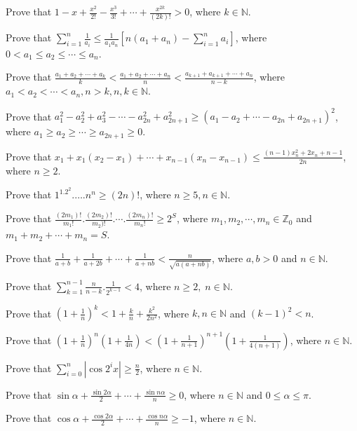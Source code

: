 \item Prove that $1 - x + \frac{x^2}{2!} - \frac{x^3}{3!} + \cdots + \frac{x^{2k}}{(2k)!} > 0$, where $k\in\mathbb{N}$.
\item Prove that $\displaystyle\sum_{i=1}^n\frac{1}{a_i}\leq\frac{1}{a_1a_n}\left[n(a_1 + a_n) - \sum_{i=1}^na_i\right]$, where
  $0<a_1\leq a_2\leq \cdots\leq a_n$.
\item Prove that $\frac{a_1 + a_2 + \cdots + a_k}{k} < \frac{a_1 + a_2 + \cdots + a_n}{n} < \frac{a_{k + 1} + a_{k + 1} + \cdots +
  a_n}{n - k}$, where $a_1 < a_2 < \cdots < a_n, n > k, n, k\in\mathbb{N}$.
\item Prove that $a_1^2 - a_2^2 + a_3^2 - \cdots - a_{2n}^2 + a_{2n + 1}^2\geq (a_1 - a_2 + \cdots - a_{2n} + a_{2n + 1})^2$, where
  $a_1\geq a_2\geq \cdots \geq a_{2n + 1}\geq 0$.
\item Prove that $x_1 + x_1(x_2 - x_1) + \cdots + x_{n - 1}(x_n - x_{n - 1})\leq \frac{(n - 1)x_n^2 + 2x_n + n - 1}{2n}$, where
  $n\geq 2$.
\item Prove that $1^1.2^2.\ldots .n^n\geq (2n)!$, where $n\geq 5, n\in\mathbb{N}$.
\item Prove that $\frac{(2m_1)!}{m_1!}.\frac{(2m_2)!}{m_2)!}.\cdots .\frac{(2m_n)!}{m_n!}\geq 2^S$, where $m_1, m_2, \cdots,
  m_n\in\mathbb{Z}_0$ and $m_1 + m_2 + \cdots + m_n = S$.
\item Prove that $\frac{1}{a + b} + \frac{1}{a + 2b} + \cdots + \frac{1}{a + nb} < \frac{n}{\sqrt{a(a + nb)}}$, where $a, b > 0$
  and $n\in\mathbb{N}$.
\item Prove that $\displaystyle\sum_{k=1}^{n - 1}\frac{n}{n - k}.\frac{1}{2^{k - 1}} < 4$, where $n\geq 2,\;n\in\mathbb{N}$.
\item Prove that $\left(1 + \frac{1}{n}\right)^k < 1 + \frac{k}{n} + \frac{k^2}{2n^2}$, where $k, n\in\mathbb{N}$ and $(k - 1)^2<
  n$.
\item Prove that $\left(1 + \frac{1}{n}\right)^n\left(1 + \frac{1}{4n}\right) < \left(1 + \frac{1}{n + 1}\right)^{n + 1}\left(1 +
  \frac{1}{4(n + 1)}\right)$, where $n\in\mathbb{N}$.
\item Prove that $\displaystyle\sum_{i=0}^n\left|\cos 2^ix\right|\geq \frac{n}{2}$, where $n\in\mathbb{N}$.
\item Prove that $\sin\alpha + \frac{\sin2\alpha}{2} + \cdots + \frac{\sin n\alpha}{n}\geq 0$, where $n\in\mathbb{N}$ and $0 \leq
  \alpha\leq \pi$.
\item Prove that $\cos\alpha + \frac{\cos2\alpha}{2} + \cdots + \frac{\cos n\alpha}{n}\geq -1$, where $n\in\mathbb{N}$.
